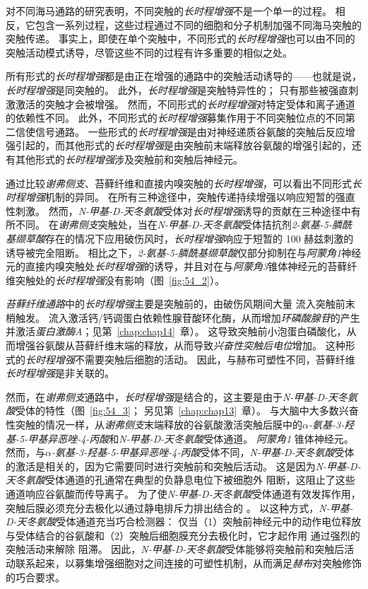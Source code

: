 对不同海马通路的研究表明，不同突触的\textit{长时程增强}不是一个单一的过程。
相反，它包含一系列过程，这些过程通过不同的细胞和分子机制加强不同海马突触的突触传递。
事实上，即使在单个突触中，不同形式的\textit{长时程增强}也可以由不同的突触活动模式诱导，尽管这些不同的过程有许多重要的相似之处。


所有形式的\textit{长时程增强}都是由正在增强的通路中的突触活动诱导的——也就是说，\textit{长时程增强}是同突触的。
此外，\textit{长时程增强}是突触特异性的；
只有那些被强直刺激激活的突触才会被增强。
然而，不同形式的\textit{长时程增强}对特定受体和离子通道的依赖性不同。 此外，不同形式的\textit{长时程增强}募集作用于不同突触位点的不同第二信使信号通路。
一些形式的\textit{长时程增强}是由对神经递质谷氨酸的突触后反应增强引起的，而其他形式的\textit{长时程增强}是由突触前末端释放谷氨酸的增强引起的，还有其他形式的\textit{长时程增强}涉及突触前和突触后神经元。


通过比较\textit{谢弗侧支}、苔藓纤维和直接内嗅突触的\textit{长时程增强}，可以看出不同形式\textit{长时程增强}机制的异同。
在所有三种途径中，突触传递持续增强以响应短暂的强直性刺激。
然而，\textit{N-甲基-D-天冬氨酸}受体对\textit{长时程增强}诱导的贡献在三种途径中有所不同。
在\textit{谢弗侧支}突触处，当在\textit{N-甲基-D-天冬氨酸}受体拮抗剂\textit{2-氨基-5-膦酰基缬草酸}存在的情况下应用破伤风时，\textit{长时程增强}响应于短暂的 100 赫兹刺激的诱导被完全阻断。
相比之下，\textit{2-氨基-5-膦酰基缬草酸}仅部分抑制在与\textit{阿蒙角1}神经元的直接内嗅突触处\textit{长时程增强}的诱导，并且对在与\textit{阿蒙角3}锥体神经元的苔藓纤维突触处的\textit{长时程增强}没有影响（图~\ref{fig:54_2}）。


\textit{苔藓纤维通路}中的\textit{长时程增强}主要是突触前的，由破伤风期间大量  流入突触前末梢触发。
 流入激活钙/钙调蛋白依赖性腺苷酸环化酶，从而增加\textit{环磷酸腺苷}的产生并激活\textit{蛋白激酶A}；见第~\ref{chap:chap14}~章）。
这导致突触前小泡蛋白磷酸化，从而增强谷氨酸从苔藓纤维末端的释放，从而导致\textit{兴奋性突触后电位}增加。
这种形式的\textit{长时程增强}不需要突触后细胞的活动。
因此，与赫布可塑性不同，苔藓纤维\textit{长时程增强}是非关联的。


然而，在\textit{谢弗侧支}通路中，\textit{长时程增强}是结合的，这主要是由于\textit{N-甲基-D-天冬氨酸}受体的特性（图~\ref{fig:54_3}；
另见第~\ref{chap:chap13}~章）。
与大脑中大多数兴奋性突触的情况一样，从\textit{谢弗侧支}末端释放的谷氨酸激活突触后膜中的\textit{$\alpha$-氨基-3-羟基-5-甲基异恶唑-4-丙酸}和\textit{N-甲基-D-天冬氨酸}受体通道。
\textit{阿蒙角1} 锥体神经元。
然而，与\textit{$\alpha$-氨基-3-羟基-5-甲基异恶唑-4-丙酸}受体不同，\textit{N-甲基-D-天冬氨酸}受体的激活是相关的，因为它需要同时进行突触前和突触后活动。
这是因为\textit{N-甲基-D-天冬氨酸}受体通道的孔通常在典型的负静息电位下被细胞外  阻断，这阻止了这些通道响应谷氨酸而传导离子。
为了使\textit{N-甲基-D-天冬氨酸}受体通道有效发挥作用，突触后膜必须充分去极化以通过静电排斥力排出结合的 。
以这种方式，\textit{N-甲基-D-天冬氨酸}受体通道充当巧合检测器：
仅当（1）突触前神经元中的动作电位释放与受体结合的谷氨酸和（2）突触后细胞膜充分去极化时，它才起作用 通过强烈的突触活动来解除  阻滞。
因此，\textit{N-甲基-D-天冬氨酸}受体能够将突触前和突触后活动联系起来，以募集增强细胞对之间连接的可塑性机制，从而满足\textit{赫布}对突触修饰的巧合要求。


